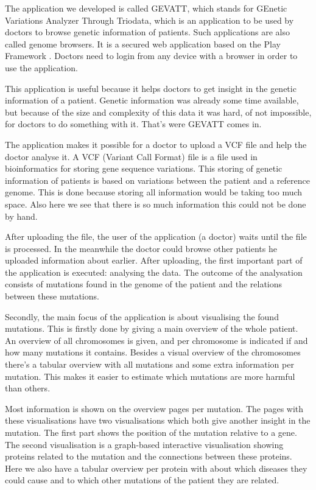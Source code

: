 The application we developed is called GEVATT, which stands for GEnetic Variations Analyzer Through Triodata, which is an application to be used by doctors to browse genetic information of patients. Such applications are also called genome browsers. It is a secured web application based on the Play Framework \cite{playframework}. Doctors need to login from any device with a browser in order to use the application.

This application is useful because it helps doctors to get insight in the genetic information of a patient. Genetic information was already some time available, but because of the size and complexity of this data it was hard, of not impossible, for doctors to do something with it. That's were GEVATT comes in.

The application makes it possible for a doctor to upload a VCF file and help the doctor analyse it. A VCF (Variant Call Format) file is a file used in bioinformatics for storing gene sequence variations. This storing of genetic information of patients is based on variations between the patient and a reference genome. This is done because storing all information would be taking too much space. Also here we see that there is so much information this could not be done by hand.

After uploading the file, the user of the application (a doctor) waits until the file is processed. In the meanwhile the doctor could browse other patients he uploaded information about earlier. After uploading, the first important part of the application is executed: analysing the data. The outcome of the analysation consists of mutations found in the genome of the patient and the relations between these mutations.

Secondly, the main focus of the application is about visualising the found mutations. This is firstly done by giving a main overview of the whole patient. An overview of all chromosomes is given, and per chromosome is indicated if and how many mutations it contains. Besides a visual overview of the chromosomes there's a tabular overview with all mutations and some extra information per mutation. This makes it easier to estimate which mutations are more harmful than others.

Most information is shown on the overview pages per mutation. The pages with these visualisations have two visualisations which both give another insight in the mutation. The first part shows the position of the mutation relative to a gene. The second visualisation is a graph-based interactive visualisation showing proteins related to the mutation and the connections between these proteins. Here we also have a tabular overview per protein with about which diseases they could cause and to which other mutations of the patient they are related.
